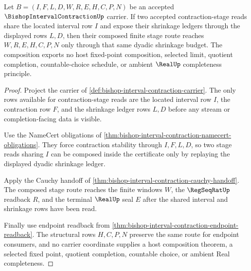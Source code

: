 \begin{theorem}
\label{thm:bishop-interval-contraction-shrinkage-composition}
Let $B=(I,F,L,D,W,R,E,H,C,P,N)$ be an accepted $\BishopIntervalContractionUp$ carrier. If two accepted contraction-stage reads share the located interval row $I$ and expose their shrinkage ledgers through the displayed rows $L,D$, then their composed finite stage route reaches $W,R,E,H,C,P,N$ only through that same dyadic shrinkage budget. The composition exports no host fixed-point composition, selected limit, quotient completion, countable-choice schedule, or ambient $\RealUp$ completeness principle.
\end{theorem}
\begin{proof}
Project the carrier of \autoref{def:bishop-interval-contraction-carrier}. The only rows available for contraction-stage reads are the located interval row $I$, the contraction row $F$, and the shrinkage ledger rows $L,D$ before any stream or completion-facing data is visible.

Use the NameCert obligations of \autoref{thm:bishop-interval-contraction-namecert-obligations}. They force contraction stability through $I,F,L,D$, so two stage reads sharing $I$ can be composed inside the certificate only by replaying the displayed dyadic shrinkage ledger.

Apply the Cauchy handoff of \autoref{thm:bishop-interval-contraction-cauchy-handoff}. The composed stage route reaches the finite windows $W$, the $\RegSeqRatUp$ readback $R$, and the terminal $\RealUp$ seal $E$ after the shared interval and shrinkage rows have been read.

Finally use endpoint readback from \autoref{thm:bishop-interval-contraction-endpoint-readback}. The structural rows $H,C,P,N$ preserve the same route for endpoint consumers, and no carrier coordinate supplies a host composition theorem, a selected fixed point, quotient completion, countable choice, or ambient Real completeness.
\end{proof}



